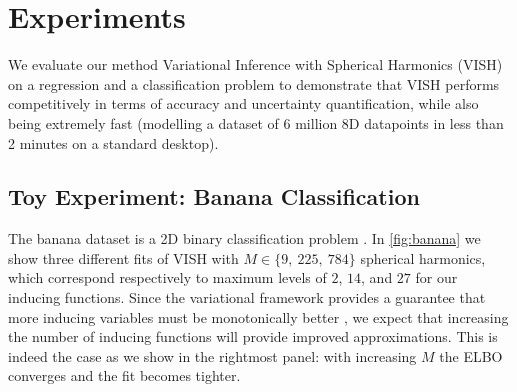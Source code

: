 

\section{Experiments}

We evaluate our method Variational Inference with Spherical Harmonics (VISH) on a regression and a classification problem to demonstrate that VISH performs competitively in terms of accuracy and uncertainty quantification, while also being extremely fast (modelling a dataset of 6 million 8D datapoints in less than 2 minutes on a standard desktop).


\subsection{Toy Experiment: Banana Classification}

The banana dataset is a 2D binary classification problem \citep{hensman2015scalable}. In \cref{fig:banana} we show three different fits of VISH with $M\in \{9,\ 225,\ 784\}$ spherical harmonics, which correspond respectively to maximum levels of $2$, $14$, and $27$ for our inducing functions. Since the variational framework provides a guarantee that more inducing variables must be monotonically better \citep{titsias2009}, we expect that increasing the number of inducing functions will provide improved approximations. This is indeed the case as we show in the rightmost panel: with increasing $M$ the ELBO converges and the fit becomes tighter.

